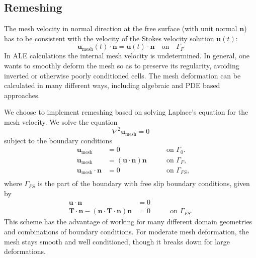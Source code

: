 \documentclass[preprint,12pt,authoryear]{elsarticle}
\begin{document}
\subsection{Remeshing}
\label{sec:remeshing}

The mesh velocity in normal direction at the free surface (with unit normal $\mathbf{n}$) has to be
consistent with the velocity of the Stokes velocity solution $\mathbf{u}(t)$:
\begin{equation}
 \mathbf{u}_\mathrm{mesh}(t) \cdot \mathbf{n} = \mathbf{u}(t) \cdot \mathbf{n} \quad \text{on} \quad \Gamma_F
\end{equation}
In ALE calculations the internal mesh velocity is undetermined.
In general, one wants to smoothly deform the mesh so as to preserve its regularity, 
avoiding inverted or otherwise poorly conditioned cells.
The mesh deformation can be calculated in many different ways, including algebraic \citep[e.g.][]{thieulot2011fantom} 
and PDE based approaches.

We choose to implement remeshing based on solving Laplace's equation for the mesh velocity.
We solve the equation
\begin{equation}
\nabla^2 \mathbf{u}_{\mathrm{mesh}} = 0
\label{eq:laplacian_smoothing}
\end{equation}
subject to the boundary conditions
\begin{equation}
\begin{aligned}
&\mathbf{u}_\mathrm{mesh} &= 0  &\qquad \textrm{on } \Gamma_0. \\
&\mathbf{u}_\mathrm{mesh} &= \left( \textbf{u} \cdot \textbf{n} \right) \textbf{n} & \qquad \textrm{on } \Gamma_F, \\
&\mathbf{u}_\mathrm{mesh} \cdot \textbf{n} &= 0  &\qquad \textrm{on } \Gamma_{FS}, \\
\end{aligned}
\label{eq:laplacian_bcs}
\end{equation}
where $\Gamma_{FS}$ is the part of the boundary with free slip boundary conditions, given by
\begin{equation}
\begin{aligned}
 \mathbf{u \cdot n} &= 0 \\ %
 \mathbf{T}\cdot \mathbf{n} - (\mathbf{n}\cdot\mathbf{T} \cdot \mathbf{n})\mathbf{n} &= 0 &\qquad \textrm{on } \Gamma_{FS}.
\end{aligned}
\label{eq:free_slip_bcs}
\end{equation}
This scheme has the advantage of working for many different domain geometries and combinations of boundary conditions.
For moderate mesh deformation, the mesh stays smooth and well conditioned, though it breaks down for large deformations.
\end{document}
